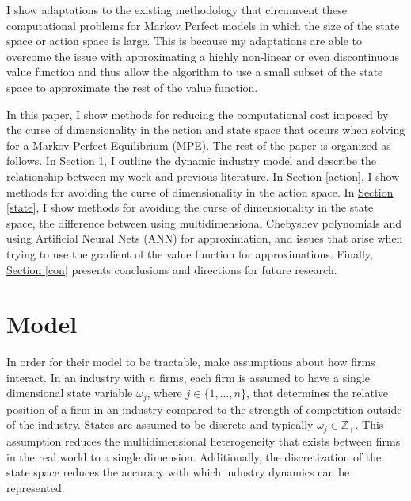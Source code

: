 \documentclass[12pt]{article}
\begin{document}
I show adaptations to the existing methodology that circumvent these computational problems for Markov Perfect models in which the size of the state space or action space is large. This is because my adaptations are able to overcome the issue with approximating a highly non-linear or even discontinuous value function and thus allow the algorithm to use a small subset of the state space to approximate the rest of the value function.

In this paper, I show methods for reducing the computational cost imposed by the curse of dimensionality in the action and state space that occurs when solving for a Markov Perfect Equilibrium (MPE). The rest of the paper is organized as follows. In \hyperref[prelit]{Section \ref{prelit}}, I outline the dynamic industry model and describe the relationship between my work and previous literature. In  \hyperref[action]{Section \ref{action}}, I show methods for avoiding the curse of dimensionality in the action space. In \hyperref[state]{Section \ref{state}}, I show methods for avoiding the curse of dimensionality in the state space, the difference between using multidimensional Chebyshev polynomials and using Artificial Neural Nets (ANN) for approximation, and issues that arise when trying to use the gradient of the value function for approximations. Finally, \hyperref[con]{Section \ref{con}} presents conclusions and directions for future research.

\section{Model}
\label{prelit}


In order for their model to be tractable, \citet{1995_Erickson_Pakes_RES} make assumptions about how firms interact. In an industry with $n$ firms, each firm is assumed to have a single dimensional state variable $\omega_j$, where $j \in \{1, \dots, n\}$, that determines the relative position of a firm in an industry compared to the strength of competition outside of the industry. States are assumed to be discrete and typically $\omega_j \in \mathbb{Z_+}$. This assumption reduces the multidimensional heterogeneity that exists between firms in the real world to a single dimension. Additionally, the discretization of the state space reduces the accuracy with which industry dynamics can be represented.
\end{document}
